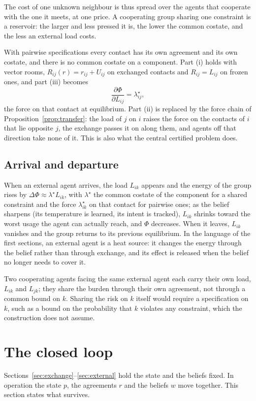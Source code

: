 \documentclass[11pt]{article}
\theoremstyle{definition}
\theoremstyle{remark}
\begin{document}
The cost of one unknown neighbour is thus spread over the agents that cooperate with the one it meets, at one price. A cooperating group sharing one constraint is a reservoir: the larger and less pressed it is, the lower the common costate, and the less an external load costs.

With pairwise specifications every contact has its own agreement and its own costate, and there is no common costate on a component. Part (i) holds with vector rooms, $R_{ij}(r)=r_{ij}+U_{ij}$ on exchanged contacts and $R_{ij}=L_{ij}$ on frozen ones, and part (iii) becomes
\[
\frac{\partial\Phi}{\partial L_{ij}}=\lambda^\star_{ij},
\]
the force on that contact at equilibrium. Part (ii) is replaced by the force chain of Proposition~\ref{prop:transfer}: the load of $j$ on $i$ raises the force on the contacts of $i$ that lie opposite $j$, the exchange passes it on along them, and agents off that direction take none of it. This is also what the central certified problem does.

\subsection{Arrival and departure}
When an external agent arrives, the load $L_{ik}$ appears and the energy of the group rises by $\Delta\Phi\approx\lambda^\star L_{ik}$, with $\lambda^\star$ the common costate of the component for a shared constraint and the force $\lambda^\star_{ik}$ on that contact for pairwise ones; as the belief sharpens (its temperature is learned, its intent is tracked), $L_{ik}$ shrinks toward the worst usage the agent can actually reach, and $\Phi$ decreases. When it leaves, $L_{ik}$ vanishes and the group returns to its previous equilibrium. In the language of the first sections, an external agent is a heat source: it changes the energy through the belief rather than through exchange, and its effect is released when the belief no longer needs to cover it.

Two cooperating agents facing the same external agent each carry their own load, $L_{ik}$ and $L_{jk}$; they share the burden through their own agreement, not through a common bound on $k$. Sharing the risk on $k$ itself would require a specification on $k$, such as a bound on the probability that $k$ violates any constraint, which the construction does not assume.

\section{The closed loop}
Sections~\ref{sec:exchange}--\ref{sec:external} hold the state and the beliefs fixed. In operation the state $p$, the agreements $r$ and the beliefs $w$ move together. This section states what survives.
\end{document}
